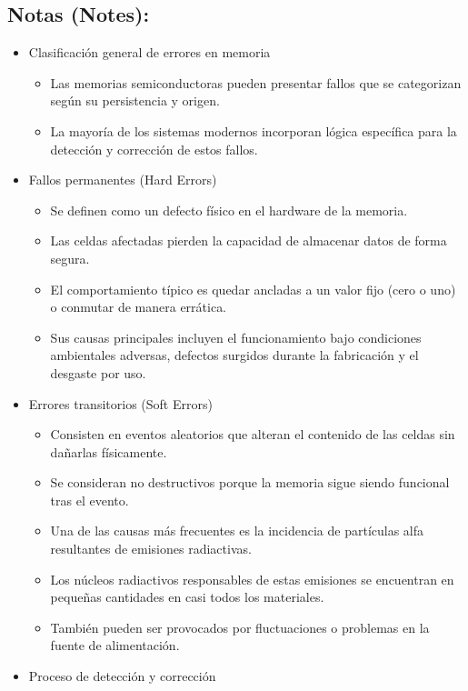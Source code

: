 \documentclass{article}
\begin{document}
\subsection{Notas (Notes):}
\label{sec:org56c3975}
\begin{itemize}
\item Clasificación general de errores en memoria
\begin{itemize}
\item Las memorias semiconductoras pueden presentar fallos que se
categorizan según su persistencia y origen.
\item La mayoría de los sistemas modernos incorporan lógica específica
para la detección y corrección de estos fallos.
\end{itemize}
\item Fallos permanentes (Hard Errors)
\begin{itemize}
\item Se definen como un defecto físico en el hardware de la memoria.
\item Las celdas afectadas pierden la capacidad de almacenar datos de
forma segura.
\item El comportamiento típico es quedar ancladas a un valor fijo
(cero o uno) o conmutar de manera errática.
\item Sus causas principales incluyen el funcionamiento bajo
condiciones ambientales adversas, defectos surgidos durante la
fabricación y el desgaste por uso.
\end{itemize}
\item Errores transitorios (Soft Errors)
\begin{itemize}
\item Consisten en eventos aleatorios que alteran el contenido de las
celdas sin dañarlas físicamente.
\item Se consideran no destructivos porque la memoria sigue siendo
funcional tras el evento.
\item Una de las causas más frecuentes es la incidencia de partículas
alfa resultantes de emisiones radiactivas.
\item Los núcleos radiactivos responsables de estas emisiones se
encuentran en pequeñas cantidades en casi todos los materiales.
\item También pueden ser provocados por fluctuaciones o problemas en
la fuente de alimentación.
\end{itemize}
\item Proceso de detección y corrección
\begin{itemize}

\end{itemize}
\end{itemize}
\end{document}
